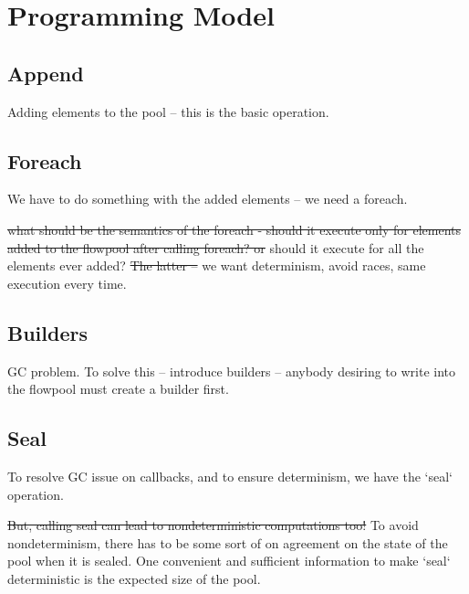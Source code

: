 \documentclass[runningheads,a4paper]{llncs}
\begin{document}
\section{Programming Model}

\subsection{Append}
Adding elements to the pool -- this is the basic operation.

\subsection{Foreach}
We have to do something with the added elements -- we need a foreach.


\sout{what should be the semantics of the foreach - should it execute only
for elements added to the flowpool after calling foreach? or} should it
execute for all the elements ever added?
\sout{The latter --} we want determinism, avoid races, same execution every
time.

\subsection{Builders}

GC problem.
To solve this -- introduce builders -- anybody desiring to write into
the flowpool must create a builder first.


\subsection{Seal}

To resolve GC issue on callbacks, and to ensure determinism, we have the `seal` operation.


\sout{But, calling seal can lead to nondeterministic computations too!} 
To avoid nondeterminism, there has to be some sort of on agreement on the
state of the pool when it is sealed. One convenient and sufficient information
to make `seal` deterministic is the expected size of the pool.
\end{document}
